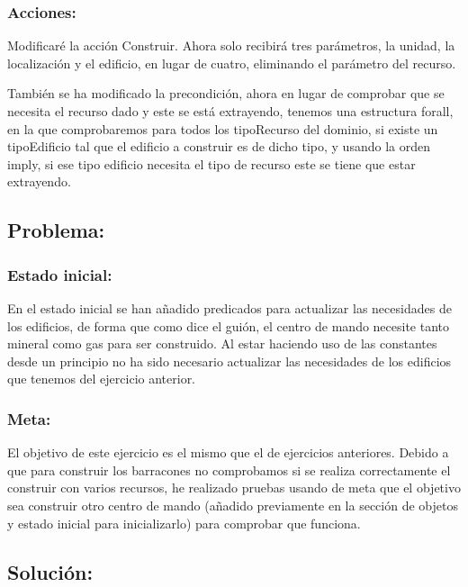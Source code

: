 \documentclass[10pt, spanish]{article}
\begin{document}
\subsubsection{Acciones:}

Modificaré la acción Construir. Ahora solo recibirá tres parámetros, la unidad, la localización y el edificio, en lugar de cuatro, eliminando el parámetro del recurso.

También se ha modificado la precondición, ahora en lugar de comprobar que se necesita el recurso dado y este se está extrayendo, tenemos una estructura forall, en la que comprobaremos para todos los tipoRecurso del dominio, si existe un tipoEdificio tal que el edificio a construir es de dicho tipo, y usando la orden imply, si ese tipo edificio necesita el tipo de recurso este se tiene que estar extrayendo.

\subsection{Problema:}

\subsubsection{Estado inicial:}

En el estado inicial se han añadido predicados para actualizar las necesidades de los edificios, de forma que como dice el guión, el centro de mando necesite tanto mineral como gas para ser construido. Al estar haciendo uso de las constantes desde un principio no ha sido necesario actualizar las necesidades de los edificios que tenemos del ejercicio anterior.

\subsubsection{Meta:}

El objetivo de este ejercicio es el mismo que el de ejercicios anteriores. Debido a que para construir los barracones no comprobamos si se realiza correctamente el construir con varios recursos, he realizado pruebas usando de meta que el objetivo sea construir otro centro de mando (añadido previamente en la sección de objetos y estado inicial para inicializarlo) para comprobar que funciona.

\subsection{Solución:}
\end{document}
